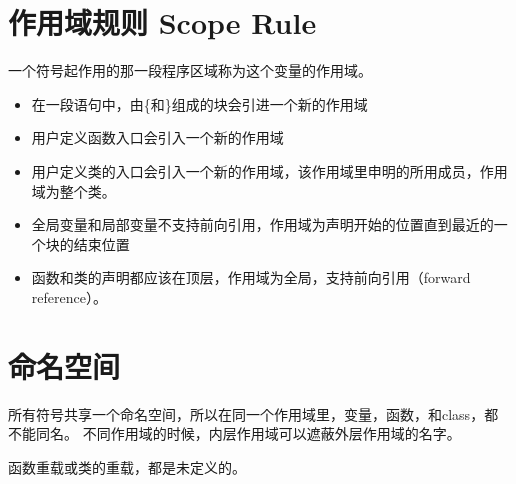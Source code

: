 \documentclass[twocolumn]{article}
\begin{document}
\section{作用域规则 Scope Rule}
一个符号起作用的那一段程序区域称为这个变量的作用域。
\begin{itemize}
\item 在一段语句中，由\{和\}组成的块会引进一个新的作用域
\item 用户定义函数入口会引入一个新的作用域
\item 用户定义类的入口会引入一个新的作用域，该作用域里申明的所用成员，作用域为整个类。
\item 全局变量和局部变量不支持前向引用，作用域为声明开始的位置直到最近的一个块的结束位置
\item 函数和类的声明都应该在顶层，作用域为全局，支持前向引用（forward reference）。
\end{itemize}

\section{命名空间}
所有符号共享一个命名空间，所以在同一个作用域里，变量，函数，和class，都不能同名。
不同作用域的时候，内层作用域可以遮蔽外层作用域的名字。

函数重载或类的重载，都是未定义的。
\end{document}
